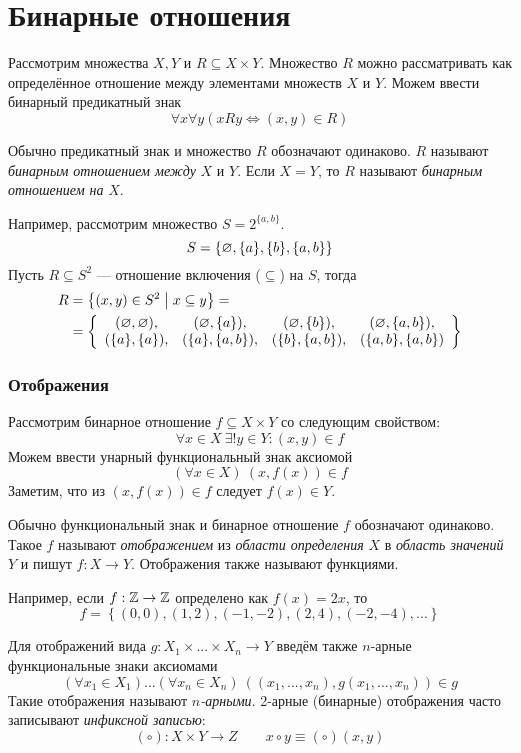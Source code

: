 \part{Бинарные отношения}

Рассмотрим множества $X,Y$ и $R\subseteq X\times Y$. Множество $R$ можно рассматривать
как определённое отношение между элементами множеств $X$ и $Y$. Можем ввести бинарный
предикатный знак
\[
	\forall x\forall y(xRy\iff (x,y)\in R)
\]

Обычно предикатный знак и множество $R$ обозначают одинаково.
$R$ называют {\it бинарным отношением между} $X$ и $Y$. Если $X=Y$,
то $R$ называют {\it бинарным отношением на} $X$.

Например, рассмотрим множество $S=2^{\{a,b\}}$.
\[
	S=\{\varnothing,\{a\},\{b\},\{a,b\}\}
\]
Пусть $R\subseteq S^{2}$ --- отношение включения ($\subseteq$) на $S$, тогда
\[
	\begin{aligned}
		R
		 & =\left\{(x,y)\in S^{2}\;\big|\; x\subseteq y\right\}= \\
		 & =\left\{
		\begin{array}{cccc}
			(\varnothing,\varnothing), & (\varnothing,\{a\}),   & (\varnothing,\{b\}),   & (\varnothing,\{a,b\}),  \\
			(\{a\},\{a\}), & (\{a\},\{a,b\}), & (\{b\},\{a,b\}), & (\{a,b\},\{a,b\})
		\end{array}\right\}
	\end{aligned}
\]

\section{Отображения}

Рассмотрим бинарное отношение $f\subseteq X\times Y$ со следующим свойством:
\[
	\forall x\in X~\exists! y\in Y:(x,y)\in f
\]
Можем ввести унарный функциональный знак аксиомой
\[
	(\forall x\in X)~(x,f(x))\in f
\]
Заметим, что из $(x,f(x))\in f$ следует $f(x)\in Y$.

Обычно функциональный знак и бинарное отношение $f$ обозначают одинаково.
Такое $f$ называют {\it отображением} из {\it области определения} $X$ в
{\it область значений} $Y$ и пишут $f:X\to Y$.
Отображения также называют функциями.

Например, если $f:\mathbb Z\to\mathbb Z$ определено как $f(x)=2x$, то
\[
	f=\left\{(0,0),(1,2),(-1,-2),(2,4),(-2,-4),...\right\}
\]

Для отображений вида $g:X_1\times ...\times X_{n}\to Y$
введём также $n$-арные функциональные знаки аксиомами
\[
	(\forall x_1\in X_1)...(\forall x_{n}\in X_{n})~
	((x_1,...,x_{n}), g(x_1,...,x_{n}))\in g
\]
Такие отображения называют {\it $n$-арными}. 2-арные (бинарные)
отображения часто записывают {\it инфиксной записью}:
\[
	(\circ):X\times Y\to Z\qquad x\circ y\equiv (\circ)(x,y)
\]


